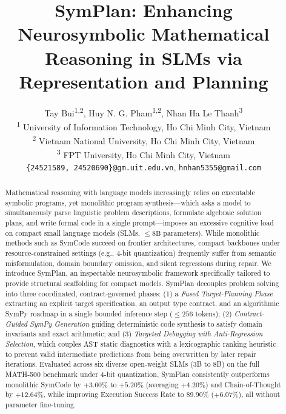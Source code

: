 \documentclass[conference,a4paper]{IEEEtran}
\begin{document}
\title{SymPlan: Enhancing Neurosymbolic Mathematical Reasoning in SLMs via Representation and Planning}

\author{
Tay Bui\textsuperscript{1,2},
Huy N. G. Pham\textsuperscript{1,2},
Nhan Ha Le Thanh\textsuperscript{3}\\
\textsuperscript{1} University of Information Technology, Ho Chi Minh City, Vietnam\\
\textsuperscript{2} Vietnam National University, Ho Chi Minh City, Vietnam\\
\textsuperscript{3} FPT University, Ho Chi Minh City, Vietnam\\
\texttt{\small \{24521589, 24520690\}@gm.uit.edu.vn},
\texttt{\small hnhan5355@gmail.com}
}

\maketitle

\begin{abstract}
Mathematical reasoning with language models increasingly relies on executable symbolic programs, yet monolithic program synthesis---which asks a model to simultaneously parse linguistic problem descriptions, formulate algebraic solution plans, and write formal code in a single prompt---imposes an excessive cognitive load on compact small language models (SLMs, $\le 8\text{B}$ parameters). While monolithic methods such as SymCode succeed on frontier architectures, compact backbones under resource-constrained settings (e.g., 4-bit quantization) frequently suffer from semantic misformulation, domain boundary omission, and silent regressions during repair. We introduce SymPlan, an inspectable neurosymbolic framework specifically tailored to provide structural scaffolding for compact models. SymPlan decouples problem solving into three coordinated, contract-governed phases: (1) a \textit{Fused Target-Planning Phase} extracting an explicit target specification, an output type contract, and an algorithmic SymPy roadmap in a single bounded inference step ($\le 256$ tokens); (2) \textit{Contract-Guided SymPy Generation} guiding deterministic code synthesis to satisfy domain invariants and exact arithmetic; and (3) \textit{Targeted Debugging with Anti-Regression Selection}, which couples AST static diagnostics with a lexicographic ranking heuristic to prevent valid intermediate predictions from being overwritten by later repair iterations. Evaluated across six diverse open-weight SLMs (3B to 8B) on the full MATH-500 benchmark under 4-bit quantization, SymPlan consistently outperforms monolithic SymCode by $+3.60\%$ to $+5.20\%$ (averaging $+4.20\%$) and Chain-of-Thought by $+12.64\%$, while improving Execution Success Rate to $89.90\%$ ($+6.07\%$), all without parameter fine-tuning.
\end{abstract}
\end{document}
